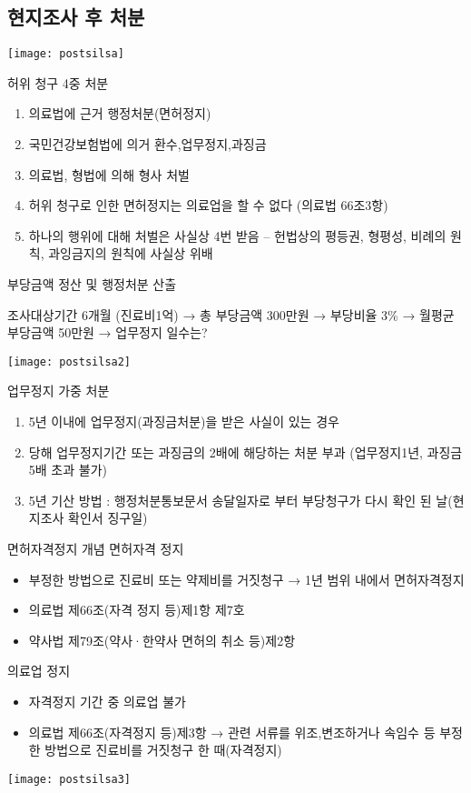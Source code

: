 \subsection{현지조사 후 처분 }
\texttt{[image: postsilsa]}

허위 청구 4중 처분  
\begin{enumerate}[1)]\tightlist
\item 의료법에 근거 행정처분(면허정지)
\item 국민건강보험법에 의거 환수,업무정지,과징금
\item 의료법, 형법에 의해 형사 처벌
\item 허위 청구로 인한 면허정지는 의료업을 할 수 없다 (의료법 66조3항)
\item 하나의 행위에 대해 처벌은 사실상 4번 받음 – 헌법상의 평등권, 형평성, 비례의 원칙, 과잉금지의 원칙에 사실상 위배
\end{enumerate}

부당금액 정산 및 행정처분 산출\par 
조사대상기간 6개월 (진료비1억) → 총 부당금액 300만원 → 부당비율 3\% → 월평균부당금액 50만원 → 업무정지 일수는?\par
\texttt{[image: postsilsa2]}\par

업무정지 가중 처분
\begin{enumerate}[1)]\tightlist
\item 5년 이내에 업무정지(과징금처분)을 받은 사실이 있는 경우
\item 당해 업무정지기간 또는 과징금의 2배에 해당하는 처분 부과 (업무정지1년, 과징금 5배 초과 불가)
\item 5년 기산 방법 : 행정처분통보문서 송달일자로 부터 부당청구가 다시 확인 된 날(현지조사 확인서 징구일)
\end{enumerate}

\begin{commentbox}{면허자격정지 개념}
면허자격 정지
\begin{itemize}\tightlist
\item 부정한 방법으로 진료비 또는 약제비를 거짓청구 → 1년 범위 내에서 면허자격정지
\item 의료법 제66조(자격 정지 등)제1항 제7호
\item  약사법 제79조(약사·한약사 면허의 취소 등)제2항
\end{itemize}
의료업 정지
\begin{itemize}\tightlist
\item 자격정지 기간 중 의료업 불가
\item 의료법 제66조(자격정지 등)제3항 → 관련 서류를 위조,변조하거나 속임수 등 부정한 방법으로 진료비를 거짓청구 한 때(자격정지)
\end{itemize}
\end{commentbox}
\texttt{[image: postsilsa3]}\par

